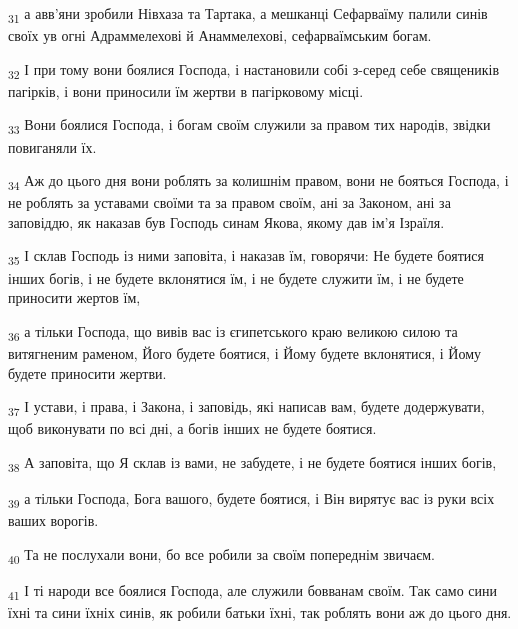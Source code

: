 \begin{tcolorbox}
\textsubscript{31} а авв'яни зробили Нівхаза та Тартака, а мешканці Сефарваїму палили синів своїх ув огні Адраммелехові й Анаммелехові, сефарваїмським богам.
\end{tcolorbox}
\begin{tcolorbox}
\textsubscript{32} І при тому вони боялися Господа, і настановили собі з-серед себе священиків пагірків, і вони приносили їм жертви в пагірковому місці.
\end{tcolorbox}
\begin{tcolorbox}
\textsubscript{33} Вони боялися Господа, і богам своїм служили за правом тих народів, звідки повиганяли їх.
\end{tcolorbox}
\begin{tcolorbox}
\textsubscript{34} Аж до цього дня вони роблять за колишнім правом, вони не бояться Господа, і не роблять за уставами своїми та за правом своїм, ані за Законом, ані за заповіддю, як наказав був Господь синам Якова, якому дав ім'я Ізраїля.
\end{tcolorbox}
\begin{tcolorbox}
\textsubscript{35} І склав Господь із ними заповіта, і наказав їм, говорячи: Не будете боятися інших богів, і не будете вклонятися їм, і не будете служити їм, і не будете приносити жертов їм,
\end{tcolorbox}
\begin{tcolorbox}
\textsubscript{36} а тільки Господа, що вивів вас із єгипетського краю великою силою та витягненим раменом, Його будете боятися, і Йому будете вклонятися, і Йому будете приносити жертви.
\end{tcolorbox}
\begin{tcolorbox}
\textsubscript{37} І устави, і права, і Закона, і заповідь, які написав вам, будете додержувати, щоб виконувати по всі дні, а богів інших не будете боятися.
\end{tcolorbox}
\begin{tcolorbox}
\textsubscript{38} А заповіта, що Я склав із вами, не забудете, і не будете боятися інших богів,
\end{tcolorbox}
\begin{tcolorbox}
\textsubscript{39} а тільки Господа, Бога вашого, будете боятися, і Він вирятує вас із руки всіх ваших ворогів.
\end{tcolorbox}
\begin{tcolorbox}
\textsubscript{40} Та не послухали вони, бо все робили за своїм попереднім звичаєм.
\end{tcolorbox}
\begin{tcolorbox}
\textsubscript{41} І ті народи все боялися Господа, але служили бовванам своїм. Так само сини їхні та сини їхніх синів, як робили батьки їхні, так роблять вони аж до цього дня.
\end{tcolorbox}
